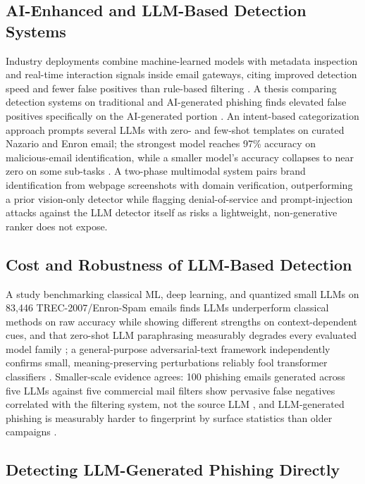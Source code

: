 \documentclass[conference]{IEEEtran}
\begin{document}
\subsection{AI-Enhanced and LLM-Based Detection Systems}

Industry deployments combine machine-learned models with metadata inspection and real-time interaction signals inside email gateways, citing improved detection speed and fewer false positives than rule-based filtering \cite{S6}. A thesis comparing detection systems on traditional and AI-generated phishing finds elevated false positives specifically on the AI-generated portion \cite{S5}. An intent-based categorization approach prompts several LLMs with zero- and few-shot templates on curated Nazario and Enron email; the strongest model reaches 97\% accuracy on malicious-email identification, while a smaller model's accuracy collapses to near zero on some sub-tasks \cite{S7}. A two-phase multimodal system pairs brand identification from webpage screenshots with domain verification, outperforming a prior vision-only detector \cite{S8} while flagging denial-of-service and prompt-injection attacks against the LLM detector itself as risks a lightweight, non-generative ranker does not expose.

\subsection{Cost and Robustness of LLM-Based Detection}

A study benchmarking classical ML, deep learning, and quantized small LLMs on 83{,}446 TREC-2007/Enron-Spam emails finds LLMs underperform classical methods on raw accuracy while showing different strengths on context-dependent cues, and that zero-shot LLM paraphrasing measurably degrades every evaluated model family \cite{S2}; a general-purpose adversarial-text framework independently confirms small, meaning-preserving perturbations reliably fool transformer classifiers \cite{jin2020textfooler}. Smaller-scale evidence agrees: 100 phishing emails generated across five LLMs against five commercial mail filters show pervasive false negatives correlated with the filtering system, not the source LLM \cite{S11}, and LLM-generated phishing is measurably harder to fingerprint by surface statistics than older campaigns \cite{S12}.

\subsection{Detecting LLM-Generated Phishing Directly}
\end{document}
